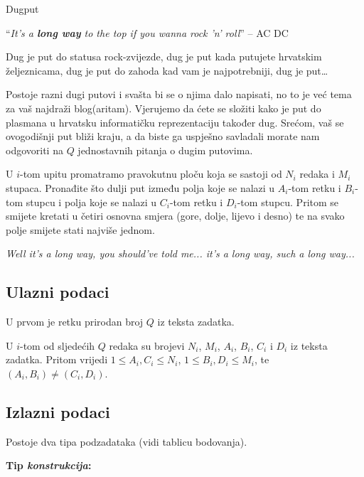 \begin{statement}[
  problempoints=100,
  timelimit=5 sekundi,
  memorylimit=512 MiB,
]{Dugput}

``\textit{It's a \textbf{long way} to the top if you wanna rock 'n' roll}'' -- AC \text{\Lightning} DC

Dug je put do statusa rock-zvijezde, dug je put kada putujete hrvatskim
željeznicama, dug je put do zahoda kad vam je najpotrebniji, dug je put\ldots

Postoje razni dugi putovi i svašta bi se o njima dalo napisati, no to je već
tema za vaš najdraži blog(aritam). Vjerujemo da ćete se složiti kako je put do
plasmana u hrvatsku informatičku reprezentaciju također dug. Srećom, vaš se
ovogodišnji put bliži kraju, a da biste ga uspješno savladali morate nam
odgovoriti na $Q$ jednostavnih pitanja o dugim putovima.

U $i$-tom upitu promatramo pravokutnu ploču koja se sastoji od $N_i$ redaka i
$M_i$ stupaca.  Pronađite što dulji put između polja koje se nalazi u
$A_i$-tom retku i $B_i$-tom stupcu i polja koje se nalazi u $C_i$-tom retku i
$D_i$-tom stupcu. Pritom se smijete kretati u četiri osnovna smjera (gore,
dolje, lijevo i desno) te na svako polje smijete stati najviše jednom.

\text{\twonotes} \textit{Well it's a long way, you should've told me... it's a long way, such a long way...}
\text{\eighthnote} \text{\twonotes}
\subsection*{Ulazni podaci}
U prvom je retku prirodan broj $Q$ iz teksta zadatka.

U $i$-tom od sljedećih $Q$ redaka su brojevi $N_i$, $M_i$, $A_i$, $B_i$, $C_i$ i 
$D_i$ iz teksta zadatka. Pritom vrijedi $1 \leq A_i, C_i \leq N_i$, $1 \leq B_i, D_i \leq M_i$, te $(A_i, B_i) \neq (C_i, D_i)$.

\subsection*{Izlazni podaci}

Postoje dva tipa podzadataka (vidi tablicu bodovanja).

\textbf{Tip \textit{konstrukcija}:}


\end{statement}

